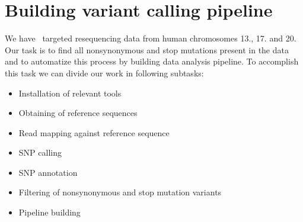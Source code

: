 \section{Building variant calling pipeline}
We have \IonTorrent~targeted resequencing data from human chromosomes 13., 17. and 20. 
Our task is to find all nonsynonymous and stop mutations present in the data
and to automatize this process by building data analysis pipeline.
To accomplish this task we can divide our work in following subtasks:
\begin{itemize}
  \item Installation of relevant tools
  \item Obtaining of reference sequences
  \item Read mapping against reference sequence
  \item SNP calling
  \item SNP annotation
  \item Filtering of nonsynonymous and stop mutation variants
  \item Pipeline building
\end{itemize}






